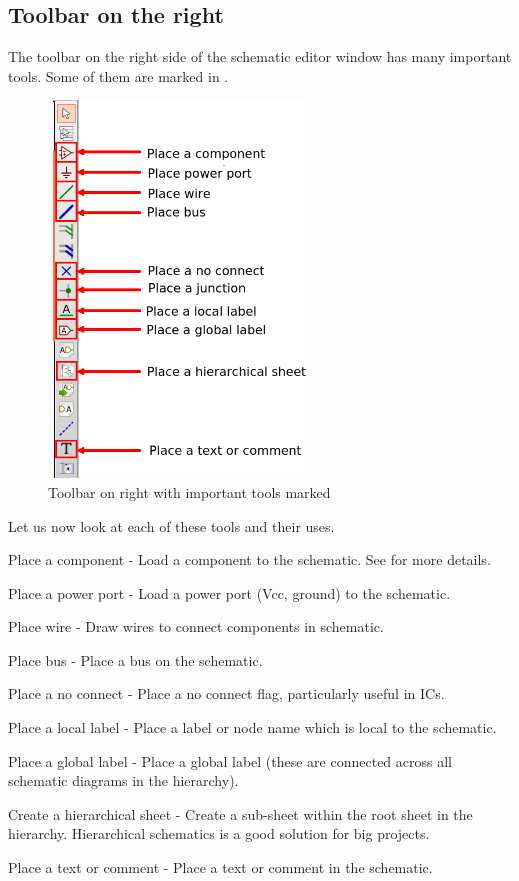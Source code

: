 \subsection{Toolbar on the right}
The toolbar on the right side of the schematic editor window has many
important tools. Some of them are marked in .
\begin{figure}[h]
\centering
\includegraphics[width=7cm,height=10cm]{manual_images/righttoolbar.png}
\caption{Toolbar on right with important tools marked}
\label{eeschem3}
\end{figure}
Let us now look at each of these tools and their uses.
\begin{compactenum}
\item Place a component - Load a component to the schematic. See
   for more details.
\item Place a power port - Load a power port (Vcc, ground) to the schematic.
\item Place wire - Draw wires to connect components in schematic.
\item Place bus - Place a bus on the schematic.
\item Place a no connect - Place a no connect flag, particularly useful in ICs.
\item Place a local label - Place a label or node name which is local to the schematic.
\item Place a global label - Place a global label (these are connected across all schematic diagrams in the hierarchy).
\item Create a hierarchical sheet - Create a sub-sheet within the root sheet in the hierarchy. Hierarchical schematics is a good solution for big projects.
\item Place a text or comment - Place a text or comment in the schematic.
\end{compactenum}
